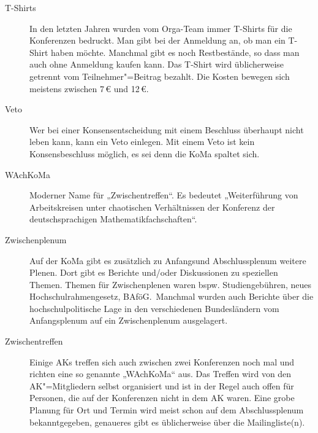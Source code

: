 \begin{description}
\item[T-Shirts] In den letzten Jahren wurden vom Orga-Team immer T-Shirts für
	die Konferenzen bedruckt. Man gibt bei der Anmeldung an, ob man ein T-Shirt
	haben möchte. Manchmal gibt es noch Restbestände, so dass man auch ohne
	Anmeldung kaufen kann. Das T-Shirt wird üblicherweise getrennt vom
	Teilnehmer"=Beitrag bezahlt. Die Kosten bewegen sich meistens zwischen 7\,€
	und 12\,€.

\item[Veto] Wer bei einer Konsensentscheidung mit einem Beschluss überhaupt
	nicht leben kann, kann ein Veto einlegen. Mit einem Veto ist kein
	Konsensbeschluss möglich, es sei denn die KoMa spaltet sich.

\item[WAchKoMa] Moderner Name für „Zwischentreffen“. Es bedeutet „Weiterführung
	von Arbeitskreisen unter chaotischen Verhältnissen der Konferenz der
	deutschsprachigen Mathematikfachschaften“.

\item[Zwischenplenum] Auf der KoMa gibt es zusätzlich zu Anfangsund
	Abschlussplenum weitere Plenen. Dort gibt es Berichte und/oder Diskussionen
	zu speziellen Themen. Themen für Zwischenplenen waren bspw.
	Studiengebühren, neues Hochschulrahmengesetz, BAföG.\ Manchmal wurden auch
	Berichte über die hochschulpolitische Lage in den verschiedenen
	Bundesländern vom Anfangsplenum auf ein Zwischenplenum ausgelagert.

\item[Zwischentreffen] Einige AKs treffen sich auch zwischen zwei Konferenzen
	noch mal und richten eine so genannte „WAchKoMa“ aus. Das Treffen wird von
	den AK"=Mitgliedern selbst organisiert und ist in der Regel auch offen für
	Personen, die auf der Konferenzen nicht in dem AK waren.  Eine grobe
	Planung für Ort und Termin wird meist schon auf dem Abschlussplenum
	bekanntgegeben, genaueres gibt es üblicherweise über die Mailingliste(n).
\end{description}
